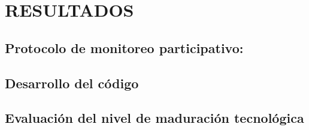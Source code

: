 \chapter{RESULTADOS}


\section{Protocolo de monitoreo participativo:}

\section{Desarrollo del código}
 

\section{Evaluación del nivel de maduración tecnológica}














